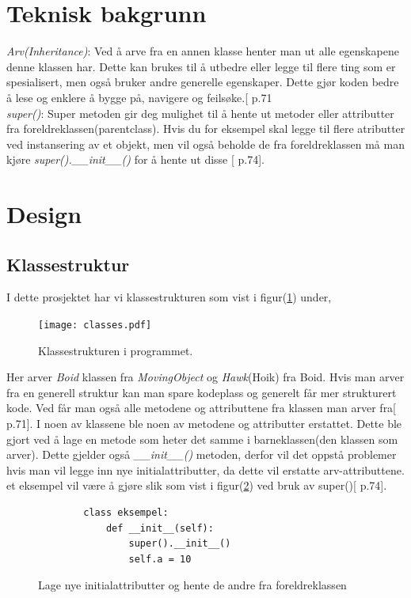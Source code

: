 {\section{Teknisk bakgrunn}
\emph{Arv(Inheritance)}: Ved å arve fra en annen klasse henter man ut alle egenskapene denne klassen har. Dette kan brukes til å utbedre eller legge til flere ting som er spesialisert, men også bruker andre generelle egenskaper. Dette gjør koden bedre å lese og enklere å bygge på, navigere og feilsøke.[\cite{Dustyphil} p.71\\
\emph{super()}: Super metoden gir deg mulighet til å hente ut metoder eller attributter fra foreldreklassen(parentclass). Hvis du for eksempel skal legge til flere atributter ved instansering av et objekt, men vil også beholde de fra foreldreklassen må man kjøre \emph{super().\_\_init\_\_()} for å hente ut disse [\cite{Dustyphil} p.74].

\section{Design}
\subsection{Klassestruktur}
I dette prosjektet har vi klassestrukturen som vist i figur(\ref{klassestrukturen}) under,
\begin{figure}[hbt!]
{\centering
    \texttt{[image: classes.pdf]}
    \caption{Klassestrukturen i programmet.}
    \label{klassestrukturen}
\par}
\end{figure}

Her arver \emph{Boid} klassen fra \emph{MovingObject} og \emph{Hawk}(Hoik) fra Boid. Hvis man arver fra en generell struktur kan man spare kodeplass og generelt får mer strukturert kode. Ved får man også alle metodene og attributtene fra klassen man arver fra[\cite{Dustyphil} p.71]. I noen av klassene ble noen av metodene og attributter erstattet. Dette ble gjort ved å lage en metode som heter det samme i barneklassen(den klassen som arver). Dette gjelder også \emph{\_\_init\_\_()} metoden, derfor vil det oppstå problemer hvis man vil legge inn nye initialattributter, da dette vil erstatte arv-attributtene. et eksempel vil være å gjøre slik som vist i figur(\ref{nye_att}) ved bruk av super()[\cite{Dustyphil} p.74].

\begin{figure}[hbt!]
    \begin{lstlisting}
        class eksempel:
            def __init__(self):
                super().__init__()
                self.a = 10
    \end{lstlisting}
\caption{Lage nye initialattributter og hente de andre fra foreldreklassen}
\label{nye_att}
\end{figure}

}

